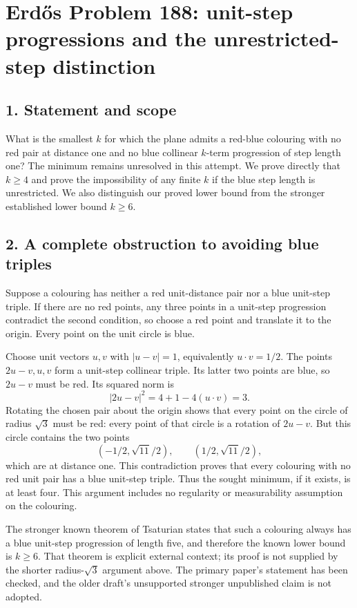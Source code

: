 \section*{Erd\H{o}s Problem 188: unit-step progressions and the unrestricted-step distinction}

\subsection*{1. Statement and scope}
What is the smallest $k$ for which the plane admits a red-blue colouring with no red pair at distance one and no blue collinear $k$-term progression of step length one? The minimum remains unresolved in this attempt. We prove directly that $k\ge4$ and prove the impossibility of any finite $k$ if the blue step length is unrestricted. We also distinguish our proved lower bound from the stronger established lower bound $k\ge6$.

\subsection*{2. A complete obstruction to avoiding blue triples}
Suppose a colouring has neither a red unit-distance pair nor a blue unit-step triple. If there are no red points, any three points in a unit-step progression contradict the second condition, so choose a red point and translate it to the origin. Every point on the unit circle is blue.

Choose unit vectors $u,v$ with $|u-v|=1$, equivalently $u\cdot v=1/2$. The points $2u-v,u,v$ form a unit-step collinear triple. Its latter two points are blue, so $2u-v$ must be red. Its squared norm is
\[
 |2u-v|^2=4+1-4(u\cdot v)=3.
\]
Rotating the chosen pair about the origin shows that every point on the circle of radius $\sqrt3$ must be red: every point of that circle is a rotation of $2u-v$. But this circle contains the two points
\[
 (-1/2,\sqrt{11}/2),\qquad(1/2,\sqrt{11}/2),
\]
which are at distance one. This contradiction proves that every colouring with no red unit pair has a blue unit-step triple. Thus the sought minimum, if it exists, is at least four. This argument includes no regularity or measurability assumption on the colouring.

The stronger known theorem of Tsaturian states that such a colouring always has a blue unit-step progression of length five, and therefore the known lower bound is $k\ge6$. That theorem is explicit external context; its proof is not supplied by the shorter radius-$\sqrt3$ argument above. The primary paper's statement has been checked, and the older draft's unsupported stronger unpublished claim is not adopted.

